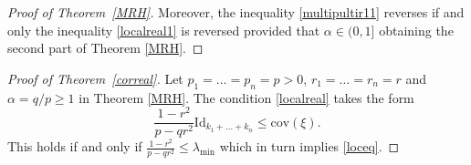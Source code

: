 \documentclass[9pt, a4paper]{amsart}
\newcommand{\1}{{\chi_{}}}%
\numberwithin{equation}{section}
\begin{document}
\begin{proof}[Proof of Theorem~\ref{MRH}]
Moreover, the inequality \eqref{multipultir11} reverses if and only the inequality \eqref{localreal1} is reversed provided that $\alpha \in (0,1]$ obtaining the second part of Theorem \ref{MRH}.
\end{proof}

\begin{proof}[Proof of Theorem~\ref{correal}]
Let $p_1=\ldots=p_n=p>0$, $r_1=\ldots=r_n=r$ and $\alpha=q/p\geq1$ in Theorem \ref{MRH}.  The condition \eqref{localreal} takes the form
\begin{equation}
\frac{1 - r^2}{p - q r^2} \mathrm{Id}_{k_{1}+\ldots+k_{n}} \leq \mathrm{cov}(\xi). \end{equation}
This holds if and only if $\frac{1-r^{2}}{p-qr^2 } \leq \lambda_{\min}$ which in turn implies \eqref{loceq}. 
\end{proof}
\end{document}
